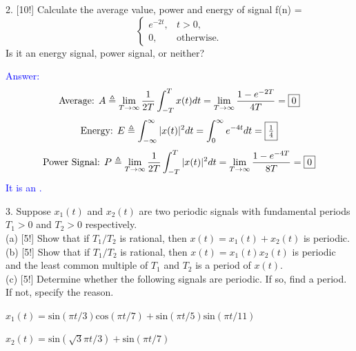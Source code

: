 \documentclass[12pt,a4paper]{article}
\begin{document}
\begin{tcolorbox}[colback = white]
2. [10!] Calculate the average value, power and energy of signal f(n) =
$$\begin{cases} 
e^{-2t},  & t>0, \\
0, & \mbox{otherwise.}
\end{cases}$$
Is it an energy signal, power signal, or neither?
\end{tcolorbox}

\begin{tcolorbox}
\normalsize
\textcolor{blue}{Answer:
$$\text{Average: }A\triangleq\lim_{T\to\infty}\frac{1}{2T}\int^{T}_{-T}x(t)dt=\lim_{T\to\infty}\frac{1-e^{-2T}}{4T}=\fbox{0}$$
$$\text{Energy: }E\triangleq\int^\infty_{-\infty}|x(t)|^2dt=\int^\infty_0e^{-4t}dt=\fbox{$\frac{1}{4}$}$$
$$\text{Power Signal: }P\triangleq\lim_{T\to\infty}\frac{1}{2T}\int^{T}_{-T}|x(t)|^2dt=\lim_{T\to\infty}\frac{1-e^{-4T}}{8T}=\fbox{0}$$
It is an .
}
\end{tcolorbox}

\begin{tcolorbox}[colback = white]
3. Suppose $x_1(t)$ and $x_2(t)$ are two periodic signals with fundamental periods $T_1>0$ and $T_2>0$ respectively.\\
(a) [5!] Show that if $T_1/T_2$ is rational, then $x(t)=x_1(t)+x_2(t)$ is periodic.\\
(b) [5!] Show that if $T_1/T_2$ is rational, then $x(t)=x_1(t)x_2(t)$ is periodic and the least common multiple of $T_1$ and $T_2$ is a period of $x(t)$.\\
(c) [5!] Determine whether the following signals are periodic. If so, find a period. If not, specify the reason.
\begin{center}
$x_1(t)=\mbox{sin}(\pi t/3)\mbox{cos}(\pi t/7)+\mbox{sin}(\pi t/5)\mbox{sin}(\pi t/11)$\\
\end{center}
\begin{center}
$x_2(t)=\mbox{sin}(\sqrt{3}\pi t/3)+\mbox{sin}(\pi t/7)$\\
\end{center}
\end{tcolorbox}
\end{document}
